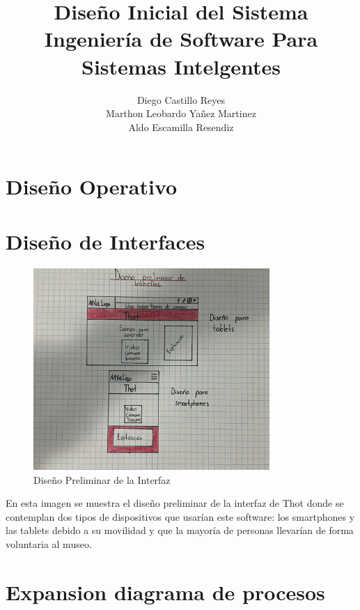 \documentclass{report}
\title{\Huge{\textbf{Diseño Inicial del Sistema}}\\
\Large{\textbf{Ingeniería de Software Para Sistemas Intelgentes}}}
\author{Diego Castillo Reyes\\Marthon Leobardo Yañez Martinez\\Aldo Escamilla Resendiz}
\begin{document}
\maketitle
\section{Diseño Operativo}




\section{Diseño de Interfaces}
    \begin{figure}[H]
        \centering
        \includegraphics[width=0.8\textwidth]{DisenioPreliminar.jpeg}
        \caption{Diseño Preliminar de la Interfaz}
    \end{figure}
    En esta imagen se muestra el diseño preliminar de la interfaz de Thot donde se 
    contemplan dos tipos de dispositivos que usarían este software: los smartphones y las tablets
    debido a su movilidad y que la mayoría de personas llevarían de forma voluntaria al museo.
    
    \section{Expansion diagrama de procesos}
\end{document}
